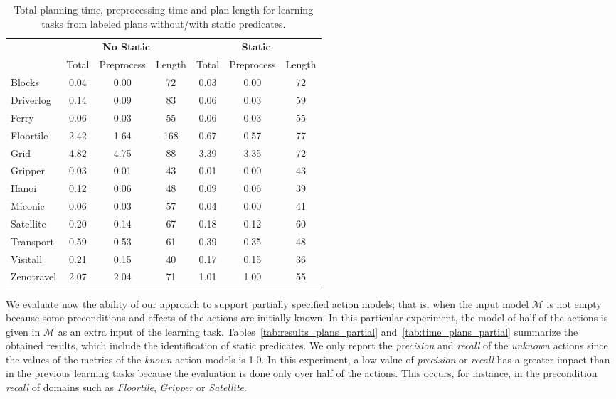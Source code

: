 \begin{table}
\begin{scriptsize}
	\begin{center}
		\begin{tabular}{l|c|c|c||c|c|c|}
                         & \multicolumn{3}{|c||}{\bf No Static}& \multicolumn{3}{|c|}{\bf Static}\\
			 & Total & Preprocess & Length  & Total & Preprocess &  Length\\
                         \hline
			Blocks & 0.04 & 0.00 & 72  & 0.03 & 0.00 & 72 \\
			Driverlog & 0.14 & 0.09 & 83 & 0.06 & 0.03 & 59 \\
			Ferry & 0.06 & 0.03 & 55 & 0.06 & 0.03 & 55 \\
			Floortile & 2.42 & 1.64 & 168 & 0.67 & 0.57 & 77 \\
			Grid & 4.82 & 4.75 & 88 & 3.39 & 3.35 & 72 \\
			Gripper & 0.03 & 0.01 & 43 & 0.01 & 0.00 & 43 \\
                        Hanoi & 0.12 & 0.06 & 48 & 0.09 & 0.06 & 39 \\
                        Miconic & 0.06 & 0.03 & 57 & 0.04 & 0.00 & 41 \\
			Satellite & 0.20 & 0.14 & 67 & 0.18 & 0.12 & 60 \\
			Transport & 0.59 & 0.53 & 61 & 0.39 & 0.35 & 48 \\
			Visitall & 0.21 & 0.15 & 40 & 0.17 & 0.15 & 36 \\
			Zenotravel & 2.07 & 2.04 & 71 & 1.01 & 1.00 & 55 \\			
		\end{tabular}
	\end{center}
        \end{scriptsize}
	\caption{\small Total planning time, preprocessing time and plan length for learning tasks from labeled plans without/with static predicates.}
	\label{tab:time_plans}	
\end{table}

We evaluate now the ability of our approach to support partially specified action models; that is, when the input model $\mathcal{M}$ is not empty because some preconditions and effects of the actions are initially known.  In this particular experiment, the model of half of the actions is given in $\mathcal{M}$ as an extra input of the learning task. Tables~\ref{tab:results_plans_partial} and~\ref{tab:time_plans_partial} summarize the obtained results, which include the identification of static predicates. We only report the {\em precision} and {\em recall} of the {\em unknown} actions since the values of the metrics of the {\em known} action models is 1.0. In this experiment, a low value of {\em precision} or {\em recall} has a greater impact than in the previous learning tasks because the evaluation is done only over half of the actions. This occurs, for instance, in the precondition \emph{recall} of domains such as {\em Floortile}, {\em Gripper} or {\em Satellite}.

